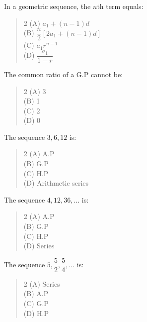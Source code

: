\documentclass[11pt,a4paper]{article}
\begin{document}
\begin{mcqlist}
\item In a geometric sequence, the $n$th term equals:
\begin{quote}\begin{multicols}{2}
\noindent (A) $a_1+(n-1)d$ \\
(B) $\dfrac{n}{2}[2a_1+(n-1)d]$ \\
(C) $a_1r^{n-1}$ \\
(D) $\dfrac{a_1}{1-r}$
\end{multicols}\end{quote}

\item The common ratio of a G.P cannot be:
\begin{quote}\begin{multicols}{2}
\noindent (A) 3 \\
(B) 1 \\
(C) 2 \\
(D) 0
\end{multicols}\end{quote}

\item The sequence $3,6,12$ is:
\begin{quote}\begin{multicols}{2}
\noindent (A) A.P \\
(B) G.P \\
(C) H.P \\
(D) Arithmetic series
\end{multicols}\end{quote}

\item The sequence $4,12,36,\ldots$ is:
\begin{quote}\begin{multicols}{2}
\noindent (A) A.P \\
(B) G.P \\
(C) H.P \\
(D) Series
\end{multicols}\end{quote}

\item The sequence $5,\dfrac{5}{2},\dfrac{5}{4},\ldots$ is:
\begin{quote}\begin{multicols}{2}
\noindent (A) Series \\
(B) A.P \\
(C) G.P \\
(D) H.P
\end{multicols}\end{quote}


\end{mcqlist}
\end{document}
